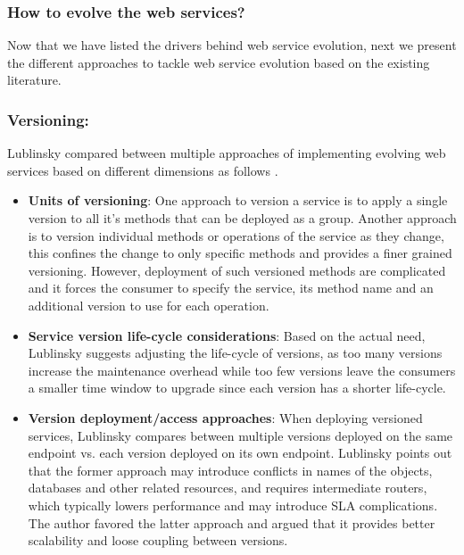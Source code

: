\documentclass[runningheads,a4paper]{llncs}
\begin{document}


\subsubsection{How to evolve the web services?} %
\label{sub:how_to_evolve_the_web_services_}
Now that we have listed the drivers behind web service evolution, next we present the different approaches to tackle web service evolution based on the existing literature.

\subsubsection{Versioning:} %
Lublinsky compared between multiple approaches of implementing evolving web services based on different dimensions as follows \cite{lublinsky2007versioning}.

\begin{itemize}

  \item \textbf{Units of versioning}: One approach to version a service is to apply a single version to all it’s methods that can be deployed as a group. Another approach is to version individual methods or operations of the service as they change, this confines the change to only specific methods and provides a finer grained versioning. However, deployment of such versioned methods are complicated and it forces the consumer to specify the service, its method name and an additional version to use for each operation.
  \item \textbf{Service version life-cycle considerations}: Based on the actual need, Lublinsky suggests adjusting the life-cycle of versions, as too many versions increase the maintenance overhead while too few versions leave the consumers a smaller time window to upgrade since each version has a shorter life-cycle.
  \item \textbf{Version deployment/access approaches}: When deploying versioned services, Lublinsky compares between multiple versions deployed on the same endpoint vs. each version deployed on its own endpoint. Lublinsky points out that the former approach may introduce conflicts in names of the objects, databases and other related resources, and requires intermediate routers, which typically lowers performance and may introduce SLA complications. The author favored the latter approach and argued that it provides better scalability and loose coupling between versions.

\end{itemize}
\end{document}
